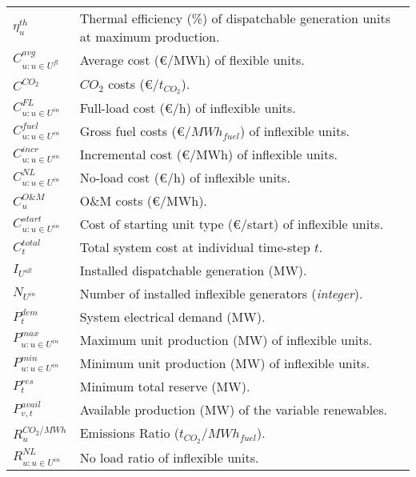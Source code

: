 \documentclass{article}
\begin{document}
\begin{table}[h]
    \label{tab:mip_parameters}
    \centering
    \begin{tabular}{ l p{10cm} }
        $\eta_{u}^{th}$  & Thermal efficiency (\%) of dispatchable generation units at maximum production. \\
        $C_{u:u \in U^{fl}}^{avg}$    & Average cost (\euro/MWh) of flexible units. \\
        $C^{CO_2}$   & $CO_2$ costs (\euro/$t_{CO_2}$). \\
        $C_{u:u \in U^{in}}^{FL}$     & Full-load cost (\euro/h) of inflexible units. \\
        $C_{u:u \in U^{in}}^{fuel}$   & Gross fuel costs (\euro/$MWh_{fuel}$) of inflexible units. \\
        $C_{u:u \in U^{in}}^{incr}$   & Incremental cost (\euro/MWh) of inflexible units. \\
        $C_{u:u \in U^{in}}^{NL}$     & No-load cost (\euro/h) of inflexible units. \\
        $C_{u}^{O\&M}$   & O\&M costs (\euro/MWh). \\
        $C_{u:u \in U^{in}}^{start}$  & Cost of starting unit type (\euro/start) of inflexible units. \\
        $C_t^{total}$ & Total system cost at individual time-step $t$. \\
        $I_{U^{all}}$          & Installed dispatchable generation (MW). \\
        $N_{U^{in}}$          & Number of installed inflexible generators (\textit{integer}). \\
        $P_t^{dem}$    & System electrical demand (MW). \\
        $P_{u:u \in U^{in}}^{max}$    & Maximum unit production (MW) of inflexible units. \\
        $P_{u:u \in U^{in}}^{min}$       & Minimum unit production (MW) of inflexible units. \\
        $P_t^{res}$       & Minimum total reserve (MW). \\
        $P_{v,t}^{avail}$      & Available production (MW) of the variable renewables. \\
        $R_{u}^{CO_2/MWh}$  & Emissions Ratio ($t_{CO_2}$/$MWh_{fuel}$). \\
        $R_{u:u \in U^{in}}^{NL}$        & No load ratio of inflexible units. \\
    \end{tabular}
\end{table}
\end{document}
